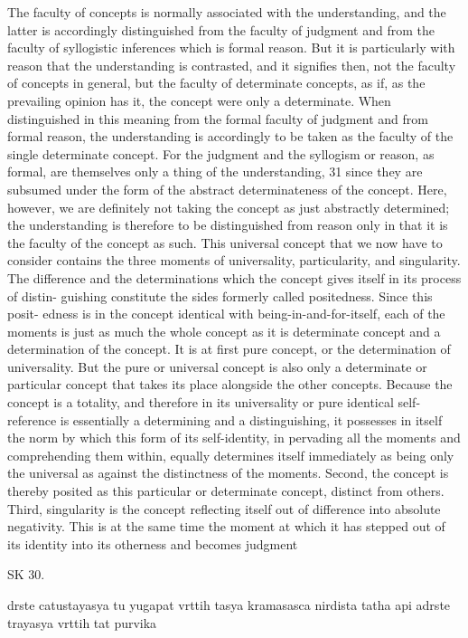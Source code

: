 The faculty of concepts is normally associated with the understanding, and
the latter is accordingly distinguished from the faculty of judgment and
from the faculty of syllogistic inferences which is formal reason. But it is
particularly with reason that the understanding is contrasted, and it signifies
then, not the faculty of concepts in general, but the faculty of determinate
concepts, as if, as the prevailing opinion has it, the concept were only a
determinate. When distinguished in this meaning from the formal faculty
of judgment and from formal reason, the understanding is accordingly to
be taken as the faculty of the single determinate concept. For the judgment
and the syllogism or reason, as formal, are themselves only a thing of the
understanding, 31 since they are subsumed under the form of the abstract
determinateness of the concept. Here, however, we are definitely not taking
the concept as just abstractly determined; the understanding is therefore
to be distinguished from reason only in that it is the faculty of the concept
as such.
This universal concept that we now have to consider contains the three
moments of universality, particularity, and singularity. The difference and
the determinations which the concept gives itself in its process of distin-
guishing constitute the sides formerly called positedness. Since this posit-
edness is in the concept identical with being-in-and-for-itself, each of the
moments is just as much the whole concept as it is determinate concept and
a determination of the concept.
It is at first pure concept, or the determination of universality. But the
pure or universal concept is also only a determinate or particular concept
that takes its place alongside the other concepts. Because the concept is
a totality, and therefore in its universality or pure identical self-reference
is essentially a determining and a distinguishing, it possesses in itself the
norm by which this form of its self-identity, in pervading all the moments
and comprehending them within, equally determines itself immediately as
being only the universal as against the distinctness of the moments.
Second, the concept is thereby posited as this particular or determinate
concept, distinct from others.
Third, singularity is the concept reflecting itself out of difference into
absolute negativity. This is at the same time the moment at which it has
stepped out of its identity into its otherness and becomes judgment

SK 30.

drste catustayasya tu yugapat vrttih tasya kramasasca nirdista
tatha api adrste trayasya vrttih tat purvika

